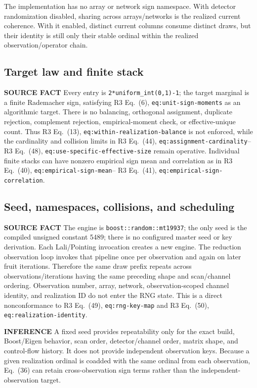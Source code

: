 \documentclass[10pt]{article}
\newcommand{\srclabel}{\textbf{SOURCE FACT}}
\newcommand{\inflabel}{\textbf{INFERENCE}}
\newcommand{\rthree}[2]{R3 Eq.~(#1), \texttt{#2}}
\begin{document}
The implementation has no array or network sign namespace.  With detector
randomization disabled, sharing across arrays/networks is the realized current
coherence.  With it enabled, distinct current columns consume distinct draws,
but their identity is still only their stable ordinal within the realized
observation/operator chain.

\subsection{Target law and finite stack}

\srclabel{} Every entry is \texttt{2*uniform\_int(0,1)-1}; the target marginal
is a finite Rademacher sign, satisfying \rthree{6}{eq:unit-sign-moments} as an
algorithmic target.  There is no balancing, orthogonal assignment,
duplicate rejection, complement rejection, empirical-moment check, or
effective-unique count.  Thus \rthree{13}{eq:within-realization-balance} is
not enforced, while the cardinality and collision limits in
\rthree{44}{eq:assignment-cardinality}--\rthree{48}{eq:use-specific-effective-size}
remain operative.  Individual finite stacks can have nonzero empirical sign
mean and correlation as in \rthree{40}{eq:empirical-sign-mean}--
\rthree{41}{eq:empirical-sign-correlation}.

\subsection{Seed, namespaces, collisions, and scheduling}

\srclabel{} The engine is \texttt{boost::random::mt19937}; the only seed is
the compiled unsigned constant 5489; there is no configured master seed or
key derivation.  Each Lali/Pointing  invocation creates
a new engine.  The reduction observation loop invokes that pipeline once per
observation and again on later fruit iterations.  Therefore the same draw
prefix repeats across observations/iterations having the same preceding
shape and scan/channel ordering.  Observation number, array, network,
observation-scoped channel identity, and realization ID do not enter the RNG
state.  This is a direct nonconformance to \rthree{49}{eq:rng-key-map} and
\rthree{50}{eq:realization-identity}.

\inflabel{} A fixed seed provides repeatability only for the exact build,
Boost/Eigen behavior, scan order, detector/channel order, matrix shape, and
control-flow history.  It does not provide independent observation keys.
Because a given realization ordinal is coadded with the same ordinal from
each observation, Eq.~(36) can retain cross-observation sign terms rather than
the independent-observation target.
\end{document}
